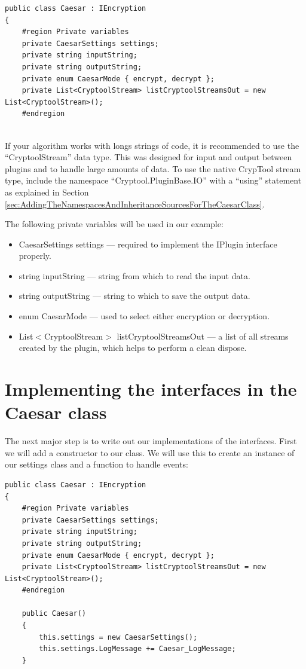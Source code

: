 \begin{lstlisting}
public class Caesar : IEncryption
{
	#region Private variables
	private CaesarSettings settings;
	private string inputString;
	private string outputString;
	private enum CaesarMode { encrypt, decrypt };
	private List<CryptoolStream> listCryptoolStreamsOut = new List<CryptoolStream>();
	#endregion
\end{lstlisting}

\ \\ %
If your algorithm works with longs strings of code, it is recommended to use the ``CryptoolStream'' data type. This was designed for input and output between plugins and to handle large amounts of data. To use the native CrypTool stream type, include the namespace ``Cryptool.PluginBase.IO'' with a ``using'' statement as explained in Section \ref{sec:AddingTheNamespacesAndInheritanceSourcesForTheCaesarClass}.

The following private variables will be used in our example:

\begin{itemize}
	\item CaesarSettings settings --- required to implement the IPlugin interface properly.
	\item string inputString --- string from which to read the input data.
	\item string outputString --- string to which to save the output data.
	\item enum CaesarMode --- used to select either encryption or decryption.
	\item List$<$CryptoolStream$>$ listCryptoolStreamsOut --- a list of all streams created by the plugin, which helps to perform a clean dispose.
\end{itemize}

\section{Implementing the interfaces in the Caesar class}
\label{sec:ImplementingTheInterfacesInTheCaesarClass}

The next major step is to write out our implementations of the interfaces. First we will add a constructor to our class. We will use this to create an instance of our settings class and a function to handle events:

\begin{lstlisting}
public class Caesar : IEncryption
{
	#region Private variables
	private CaesarSettings settings;
	private string inputString;
	private string outputString;
	private enum CaesarMode { encrypt, decrypt };
	private List<CryptoolStream> listCryptoolStreamsOut = new List<CryptoolStream>();
	#endregion
	
	public Caesar()
	{
		this.settings = new CaesarSettings();
		this.settings.LogMessage += Caesar_LogMessage;
	}
\end{lstlisting}

